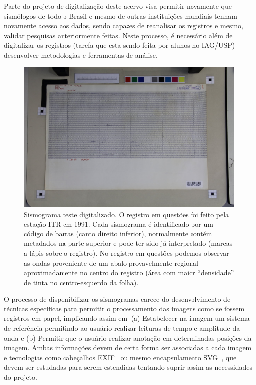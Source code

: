 \documentclass{article}
\begin{document}
Parte do projeto de digitalização deste acervo visa permitir novamente
que sismólogos de todo o Brasil e mesmo de outras instituições
mundiais tenham novamente acesso aos dados, sendo capazes de
reanalisar os registros e mesmo, validar pesquisas anteriormente
feitas. Neste processo, é necessário além de digitalizar os registros
(tarefa que esta sendo feita por alunos no IAG/USP) desenvolver
metodologias e ferramentas de análise.
\begin{figure}[htb]
  \begin{center}
    \includegraphics[scale=0.25]{sismograma.jpg}
\caption{Sismograma teste digitalizado. O registro em questões foi
  feito pela estação ITR em 1991. Cada sismograma é identificado por
  um código de barras (canto direito inferior), normalmente contém
  metadados na parte superior e pode ter sido já interpretado (marcas
  a lápis sobre o registro). No registro em questões podemos observar
  as ondas proveniente de um abalo provavelmente regional
  aproximadamente no centro do registro (área com maior “densidade” de
  tinta no centro-esquerdo da folha).}
\label{sismograma}
\end{center}
\end{figure}
O processo de disponibilizar os sismogramas carece do desenvolvimento
de técnicas especificas para permitir o processamento das imagens como
se fossem registros em papel, implicando assim em: (a) Estabelecer na
imagem um sistema de referência permitindo ao usuário realizar
leituras de tempo e amplitude da onda e (b) Permitir que o usuário
realizar anotação em determinadas posições da imagem. Ambas
informações devem de certa forma ser associadas a cada imagem e
tecnologias como cabeçalhos EXIF~\cite{exif} ou mesmo encapsulamento
SVG~\cite{svg}, que devem ser estudadas para serem estendidas tentando
suprir assim as necessidades do projeto. 
\end{document}

